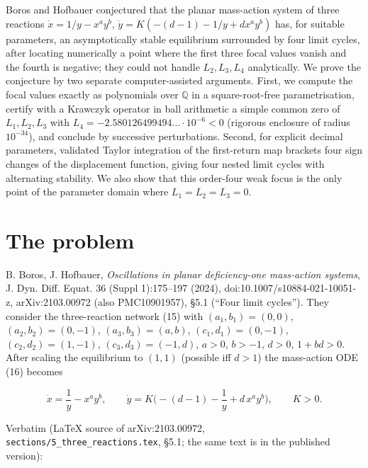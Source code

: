 \documentclass[11pt,a4paper]{report}
\begin{document}
\makepapertitle

\begin{paperabstract}
Boros and Hofbauer conjectured that the planar mass-action system of three reactions
\(\dot x=1/y-x^ay^b\), \(\dot y=K(-(d-1)-1/y+dx^ay^b)\) has, for suitable parameters, an asymptotically stable
equilibrium surrounded by four limit cycles, after locating numerically a point where the first three focal values
vanish and the fourth is negative; they could not handle \(L_2,L_3,L_4\) analytically. We prove the conjecture by two
separate computer-assisted arguments. First, we compute the focal values exactly as polynomials over
\(\mathbb Q\) in a square-root-free parametrisation, certify with a Krawczyk operator in ball arithmetic a simple
common zero of \(L_1,L_2,L_3\) with \(L_4=-2.580126499494\ldots\cdot10^{-6}<0\) (rigorous enclosure of radius
\(10^{-34}\)), and conclude by successive
perturbations. Second, for explicit decimal parameters, validated Taylor integration of the first-return map brackets
four sign changes of the displacement function, giving four nested limit cycles with alternating stability. We also
show that this order-four weak focus is the only point of the parameter domain where \(L_1=L_2=L_3=0\).
\end{paperabstract}

\section{The problem}

B. Boros, J. Hofbauer, \emph{Oscillations in planar deficiency-one mass-action systems}, J. Dyn. Diff. Equat. 36
(Suppl 1):175--197 (2024), doi:10.1007/s10884-021-10051-z, arXiv:2103.00972 (also PMC10901957), §5.1
(``Four limit cycles''). They consider the three-reaction network (15) with
\((a_1,b_1)=(0,0)\), \((a_2,b_2)=(0,-1)\), \((a_3,b_3)=(a,b)\), \((c_1,d_1)=(0,-1)\), \((c_2,d_2)=(1,-1)\),
\((c_3,d_3)=(-1,d)\), \(a>0\), \(b>-1\), \(d>0\), \(1+bd>0\). After scaling the equilibrium to \((1,1)\)
(possible iff \(d>1\)) the mass-action ODE (16) becomes

\[\dot x = \frac1y - x^a y^b,\qquad
\dot y = K\Big(-(d-1) - \frac1y + d\,x^a y^b\Big),\qquad K>0. \tag{BH}\]

Verbatim (LaTeX source of arXiv:2103.00972, \texttt{sections/5\_three\_reactions.tex}, §5.1; the same text is in the
published version):
\end{document}
